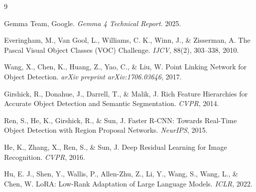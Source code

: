 \documentclass[12pt, a4paper]{article}
\begin{document}
\begin{thebibliography}{9}

Gemma Team, Google. \textit{Gemma 4 Technical Report}. 2025.

Everingham, M., Van Gool, L., Williams, C. K., Winn, J., \& Zisserman, A. The Pascal Visual Object Classes (VOC) Challenge. \textit{IJCV}, 88(2), 303--338, 2010.

Wang, X., Chen, K., Huang, Z., Yao, C., \& Liu, W. Point Linking Network for Object Detection. \textit{arXiv preprint arXiv:1706.03646}, 2017.

Girshick, R., Donahue, J., Darrell, T., \& Malik, J. Rich Feature Hierarchies for Accurate Object Detection and Semantic Segmentation. \textit{CVPR}, 2014.

Ren, S., He, K., Girshick, R., \& Sun, J. Faster R-CNN: Towards Real-Time Object Detection with Region Proposal Networks. \textit{NeurIPS}, 2015.

He, K., Zhang, X., Ren, S., \& Sun, J. Deep Residual Learning for Image Recognition. \textit{CVPR}, 2016.

Hu, E. J., Shen, Y., Wallis, P., Allen-Zhu, Z., Li, Y., Wang, S., Wang, L., \& Chen, W. LoRA: Low-Rank Adaptation of Large Language Models. \textit{ICLR}, 2022.

\end{thebibliography}
\end{document}
